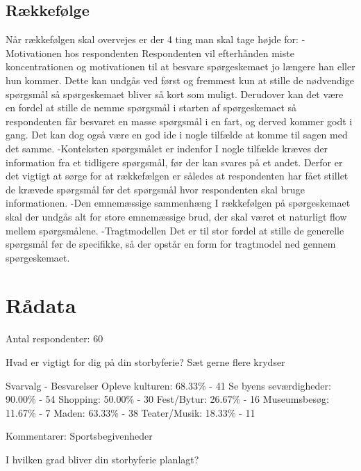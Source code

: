 \subsection{Rækkefølge}
Når rækkefølgen skal overvejes er der 4 ting man skal tage højde for: 
-Motivationen hos respondenten
Respondenten vil efterhånden miste koncentrationen og motivationen til at besvare spørgeskemaet jo længere han eller hun kommer. Dette kan undgås ved først og fremmest kun at stille de nødvendige spørgsmål så spørgeskemaet bliver så kort som muligt. Derudover kan det være en fordel at stille de nemme spørgsmål i starten af spørgeskemaet så respondenten får besvaret en masse spørgsmål i en fart, og derved kommer godt i gang. Det kan dog også være en god ide i nogle tilfælde at komme til sagen med det samme.
-Konteksten spørgsmålet er indenfor 
I nogle tilfælde kræves der information fra et tidligere spørgsmål, før der kan svares på et andet. Derfor er det vigtigt at sørge for at rækkefælgen er således at respondenten har fået stillet de krævede spørgsmål før det spørgsmål hvor respondenten skal bruge informationen.
-Den emnemæssige sammenhæng 
I rækkefølgen på spørgeskemaet skal der undgås alt for store emnemæssige brud, der skal været et naturligt flow mellem spørgsmålene.
-Tragtmodellen
Det er til stor fordel at stille de generelle spørgsmål før de specifikke, så der opstår en form for tragtmodel ned gennem spørgeskemaet.

\section{Rådata}
Antal respondenter: 60

Hvad er vigtigt for dig på din storbyferie?
Sæt gerne flere krydser

Svarvalg - Besvarelser \newline
Opleve kulturen:
68.33\%  -  41 \newline
Se byens seværdigheder:
90.00\%  -  54 \newline
Shopping:
50.00\%  -  30 \newline
Fest/Bytur:
26.67\%  -  16 \newline
Museumsbesøg:
11.67\%  -   7 \newline
Maden:
63.33\%  -  38 \newline
Teater/Musik: 
18.33\%  -  11 \newline

Kommentarer:
Sportsbegivenheder

I hvilken grad bliver din storbyferie planlagt?

